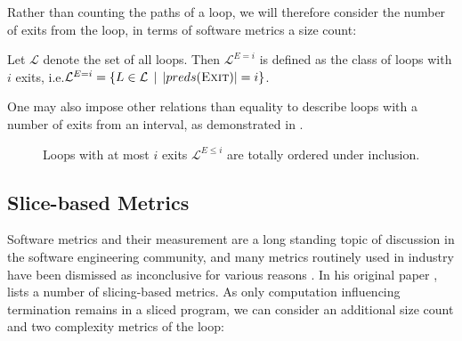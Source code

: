 Rather than counting the paths of a loop, we will therefore consider the number of exits from the loop, in terms of software metrics a size count:

\begin{definition}
    Let $\mathcal{L}$ denote the set of all loops. Then $\mathcal{L}^{E=i}$ is defined as the class of loops with $i$ exits, i.e.\@ $\mathcal{L}^{E=i} = \{ L \in \mathcal{L} \,\mid\, |preds(\textsc{Exit})| = i \}$.
\end{definition}

One may also impose other relations than equality to describe loops with a number of exits from an interval, as demonstrated in .

\def\cg{(2.5cm,0) ellipse (6cm and 3cm)}
\def\cc{(1cm,0) ellipse (4cm and 2.5cm)}
\def\cb{(0.5cm,0) ellipse (3cm and 2cm)}
\def\cp{(0,-0.5cm) ellipse (2cm and 1cm)}
\def\ca{(0,0) ellipse (2cm and 1cm)}

\begin{figure}[h]

\caption{Loops with at most $i$ exits $\mathcal{L}^{E \le i}$ are totally ordered under inclusion.}
\label{fig:exit_hierarchy}
\end{figure}

\subsection{Slice-based Metrics}
\label{sub:slice_based_class}

Software metrics and their measurement are a long standing topic of discussion in the software engineering community, and many metrics routinely used in industry have been dismissed as inconclusive for various reasons \cite{DBLP:journals/jss/FentonN99}. In his original paper \cite{DBLP:conf/icse/Weiser81}, \citeauthor{DBLP:conf/icse/Weiser81} lists a number of slicing-based metrics. As only computation influencing termination remains in a sliced program, we can consider an additional size count and two complexity metrics of the loop:

